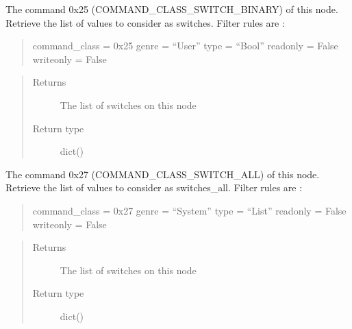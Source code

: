 \documentclass[letterpaper,10pt,english]{sphinxmanual}
\begin{document}
\begin{fulllineitems}
\begin{fulllineitems}
\label{command:openzwave.command.ZWaveNodeSwitch.get_switches}
The command 0x25 (COMMAND\_CLASS\_SWITCH\_BINARY) of this node.
Retrieve the list of values to consider as switches.
Filter rules are :
\begin{quote}

command\_class = 0x25
genre = ``User''
type = ``Bool''
readonly = False
writeonly = False
\end{quote}
\begin{quote}\begin{description}
\item[{Returns}] \leavevmode
The list of switches on this node

\item[{Return type}] \leavevmode
dict()

\end{description}\end{quote}

\end{fulllineitems}


\begin{fulllineitems}
\label{command:openzwave.command.ZWaveNodeSwitch.get_switches_all}
The command 0x27 (COMMAND\_CLASS\_SWITCH\_ALL) of this node.
Retrieve the list of values to consider as switches\_all.
Filter rules are :
\begin{quote}

command\_class = 0x27
genre = ``System''
type = ``List''
readonly = False
writeonly = False
\end{quote}
\begin{quote}\begin{description}
\item[{Returns}] \leavevmode
The list of switches on this node

\item[{Return type}] \leavevmode
dict()

\end{description}\end{quote}

\end{fulllineitems}



\end{fulllineitems}
\end{document}
